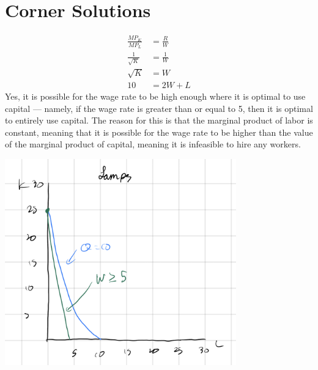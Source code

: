 \documentclass[8pt]{extarticle}
\begin{document}
{\section{Corner Solutions}
\begin{align*}
	\frac{MP_K}{MP_L} &= \frac{R}{W} \\
	\frac{1}{\sqrt{K}} &= \frac{1}{W} \\
	\sqrt{K} &= W \\
	10 &= 2W + L
\end{align*}
Yes, it is possible for the wage rate to be high enough where it is optimal to use capital — namely, if the wage rate is greater than or equal to 5, then it is optimal to entirely use capital. The reason for this is that the marginal product of labor is constant, meaning that it is possible for the wage rate to be higher than the value of the marginal product of capital, meaning it is infeasible to hire any workers.
\begin{center}
	\includegraphics[width=10cm]{HW6Q10}
\end{center}
\pagebreak
}
\end{document}
